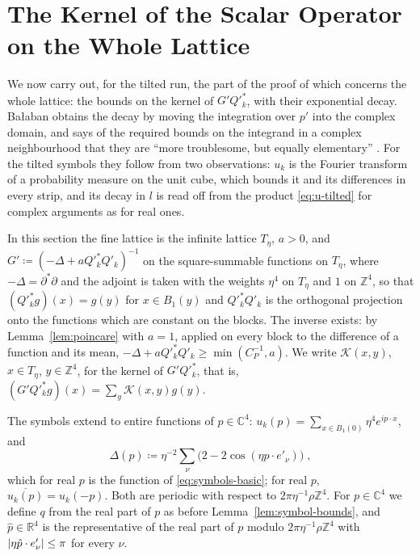 \documentclass[11pt]{preprint}
\DeclarePairedDelimiter{\abs}{\lvert}{\rvert}
\numberwithin{equation}{section}
\theoremstyle{definition}
\theoremstyle{remark}
\theoremstyle{plain}
\begin{document}
\section{The Kernel of the Scalar Operator on the Whole Lattice}\label{sec:kernel}

We now carry out, for the tilted run, the part of the proof of \cite[Lemma~2.4]{BalabanRDG} which concerns the whole lattice: the bounds \cite[(2.35), (2.36)]{BalabanRDG} on the kernel of $G'Q'^*_k$, with their exponential decay. Ba{\l}aban obtains the decay by moving the integration over $p'$ into the complex domain, and says of the required bounds on the integrand in a complex neighbourhood that they are ``more troublesome, but equally elementary'' \cite[p.~586]{BalabanRDG}. For the tilted symbols they follow from two observations: $u_k$ is the Fourier transform of a probability measure on the unit cube, which bounds it and its differences in every strip, and its decay in $l$ is read off from the product \eqref{eq:u-tilted} for complex arguments as for real ones.

In this section the fine lattice is the infinite lattice $T_\eta$, $a > 0$, and $G' \coloneqq (-\Delta + aQ'^*_kQ'_k)^{-1}$ on the square-summable functions on $T_\eta$, where $-\Delta = \partial^*\partial$ and the adjoint is taken with the weights $\eta^4$ on $T_\eta$ and $1$ on $\mathbb Z^4$, so that $(Q'^*_kg)(x) = g(y)$ for $x \in B_1(y)$ and $Q'^*_kQ'_k$ is the orthogonal projection onto the functions which are constant on the blocks. The inverse exists: by Lemma~\ref{lem:poincare} with $a = 1$, applied on every block to the difference of a function and its mean, $-\Delta + aQ'^*_kQ'_k \geq \min(C_P^{-1}, a)$. We write $\mathcal K(x, y)$, $x \in T_\eta$, $y \in \mathbb Z^4$, for the kernel of $G'Q'^*_k$, that is, $(G'Q'^*_kg)(x) = \sum_y\mathcal K(x, y)g(y)$.

The symbols extend to entire functions of $p \in \mathbb C^4$: $u_k(p) = \sum_{x \in B_1(0)}\eta^4e^{ip \cdot x}$, and
\begin{equation}\label{eq:delta-entire}
    \Delta(p) \coloneqq \eta^{-2}\sum_\nu\bigl(2 - 2\cos(\eta p \cdot e'_\nu)\bigr)\;,
\end{equation}
which for real $p$ is the function of \eqref{eq:symbols-basic}; for real $p$, $\overline{u_k(p)} = u_k(-p)$. Both are periodic with respect to $2\pi\eta^{-1}\rho\mathbb Z^4$. For $p \in \mathbb C^4$ we define $q$ from the real part of $p$ as before Lemma~\ref{lem:symbol-bounds}, and $\hat p \in \mathbb R^4$ is the representative of the real part of $p$ modulo $2\pi\eta^{-1}\rho\mathbb Z^4$ with $\abs{\eta\hat p \cdot e'_\nu} \leq \pi$ for every $\nu$.
\end{document}
